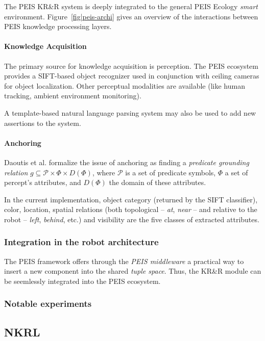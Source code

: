 \documentclass[a4paper, twocolumn]{article}
\begin{document}
The PEIS KR\&R system is deeply integrated to the general PEIS Ecology
\emph{smart} environment. Figure~\ref{fig|peis-archi} gives an overview of the
interactions between PEIS knowledge processing layers.

\paragraph{Knowledge Acquisition} The primary source for knowledge acquisition
is perception.  The PEIS ecosystem provides a SIFT-based object recognizer used
in conjunction with ceiling cameras for object localization.  Other perceptual
modalities are available (like human tracking, ambient environment monitoring).

A template-based natural language parsing system may also be used to add new
assertions to the system.

\paragraph{Anchoring} Daoutis et al. formalize the issue of anchoring as
finding a \emph{predicate grounding relation} $g \subseteq \mathcal{P} \times
\Phi \times D(\Phi)$, where $\mathcal{P}$ is a set of predicate symbols, $\Phi$
a set of percept's attributes, and $D(\Phi)$ the domain of these attributes.

In the current implementation, object category (returned by the SIFT
classifier), color, location, spatial relations (both topological -- \emph{at},
\emph{near} -- and relative to the robot -- \emph{left}, \emph{behind}, etc.)
and visibility are the five classes of extracted attributes.

\subsubsection{Integration in the robot architecture}
\label{sect|peis-integration}

The PEIS framework offers through the \emph{PEIS middleware} a practical way to
insert a new component into the shared \emph{tuple space}.  Thus, the KR\&R
module can be seemlessly integrated into the PEIS ecosystem.

\subsubsection{Notable experiments}
\label{sect|peis-expe}

\subsection{NKRL}
\label{sect|nkrl}
\end{document}
